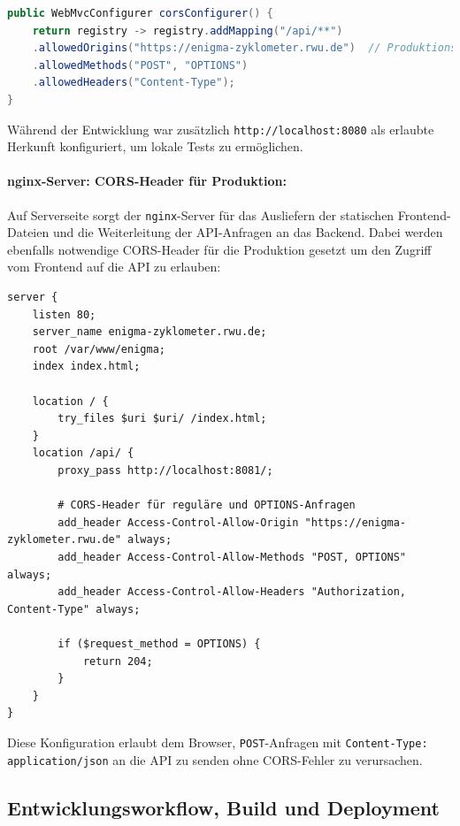 \documentclass[12pt, ngerman, a4paper, numbers=noenddot]{article}
\begin{document}
\begin{lstlisting}[language=Java, caption=Spring Boot CORS-Konfiguration]
public WebMvcConfigurer corsConfigurer() {
	return registry -> registry.addMapping("/api/**")
	.allowedOrigins("https://enigma-zyklometer.rwu.de")  // Produktionsdomain
	.allowedMethods("POST", "OPTIONS")
	.allowedHeaders("Content-Type");
}
\end{lstlisting}

Während der Entwicklung war zusätzlich \lstinline|http://localhost:8080| als erlaubte Herkunft konfiguriert, um lokale Tests zu ermöglichen.


\paragraph{nginx-Server: CORS-Header für Produktion:}

Auf Serverseite sorgt der \lstinline|nginx|-Server für das Ausliefern der statischen Frontend-Dateien und die Weiterleitung der API-Anfragen an das Backend. Dabei werden ebenfalls notwendige CORS-Header für die Produktion gesetzt um den Zugriff vom Frontend auf die API zu erlauben:
\newpage
\begin{lstlisting}[language=nginx, caption=Konfiguration des \lstinline|nginx|-Servers]
server {
	listen 80;
	server_name enigma-zyklometer.rwu.de;
	root /var/www/enigma;
	index index.html;
	
	location / {
		try_files $uri $uri/ /index.html;
	}
	location /api/ {
		proxy_pass http://localhost:8081/;
		
		# CORS-Header für reguläre und OPTIONS-Anfragen
		add_header Access-Control-Allow-Origin "https://enigma-zyklometer.rwu.de" always;
		add_header Access-Control-Allow-Methods "POST, OPTIONS" always;
		add_header Access-Control-Allow-Headers "Authorization, Content-Type" always;
		
		if ($request_method = OPTIONS) {
			return 204;
		}
	}
}
\end{lstlisting}

Diese Konfiguration erlaubt dem Browser, \lstinline|POST|-Anfragen mit \newline\lstinline|Content-Type: application/json| an die API zu senden ohne CORS-Fehler zu verursachen.

\subsection{Entwicklungsworkflow, Build und Deployment}
\end{document}
